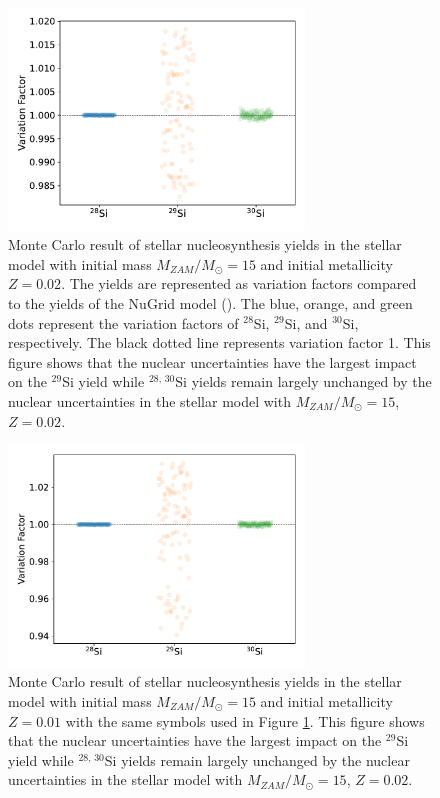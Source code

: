 \documentclass{brandeis-thesis3.2}
\def \msun {M_{\odot}}
\newcommand{\iso}[2]{$^{#1}${#2}}
\begin{document}
\begin{figure}[H]
    \centering
    \includegraphics[width=0.7\textwidth]{figs/M15Z2E-2_mcyieldresult.pdf}
    \caption{Monte Carlo result of stellar nucleosynthesis yields in the stellar model with initial mass $M_{ZAM}/\msun =15$ and initial metallicity $Z=0.02$. The yields are represented as variation factors compared to the yields of the NuGrid model (\citealt{Ritter_2018}). The blue, orange, and green dots represent the variation factors of \iso{28}{Si}, \iso{29}{Si}, and \iso{30}{Si}, respectively. The black dotted line represents variation factor 1. This figure shows that the nuclear uncertainties have the largest impact on the \iso{29}{Si} yield while \iso{28,\, 30}{Si} yields remain largely unchanged by the nuclear uncertainties in the stellar model with $M_{ZAM}/\msun =15$, $Z=0.02$.}
    \label{fig:m15z02_yield}
\end{figure}

\begin{figure}[H]
    \centering
    \includegraphics[width=0.7\textwidth]{figs/M15Z1E-2_mcyieldresult.pdf}
    \caption{Monte Carlo result of stellar nucleosynthesis yields in the stellar model with initial mass $M_{ZAM}/\msun =15$ and initial metallicity $Z=0.01$ with the same symbols used in Figure \ref{fig:m15z02_yield}. This figure shows that the nuclear uncertainties have the largest impact on the \iso{29}{Si} yield while \iso{28,\, 30}{Si} yields remain largely unchanged by the nuclear uncertainties in the stellar model with $M_{ZAM}/\msun =15$, $Z=0.02$.}
    \label{fig:m15z01_yield}
\end{figure}
\end{document}

